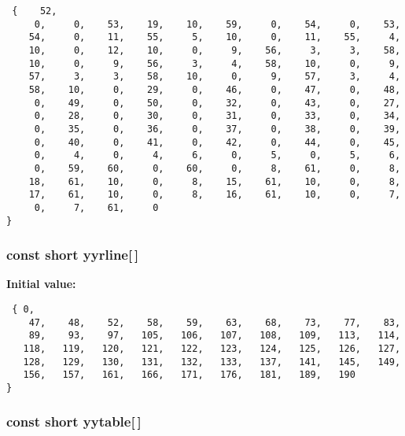 \footnotesize\begin{verbatim} {    52,
     0,     0,    53,    19,    10,    59,     0,    54,     0,    53,
    54,     0,    11,    55,     5,    10,     0,    11,    55,     4,
    10,     0,    12,    10,     0,     9,    56,     3,     3,    58,
    10,     0,     9,    56,     3,     4,    58,    10,     0,     9,
    57,     3,     3,    58,    10,     0,     9,    57,     3,     4,
    58,    10,     0,    29,     0,    46,     0,    47,     0,    48,
     0,    49,     0,    50,     0,    32,     0,    43,     0,    27,
     0,    28,     0,    30,     0,    31,     0,    33,     0,    34,
     0,    35,     0,    36,     0,    37,     0,    38,     0,    39,
     0,    40,     0,    41,     0,    42,     0,    44,     0,    45,
     0,     4,     0,     4,     6,     0,     5,     0,     5,     6,
     0,    59,    60,     0,    60,     0,     8,    61,     0,     8,
    18,    61,    10,     0,     8,    15,    61,    10,     0,     8,
    17,    61,    10,     0,     8,    16,    61,    10,     0,     7,
     0,     7,    61,     0
}\end{verbatim}\normalsize 
{}
\subsubsection{\setlength{\rightskip}{0pt plus 5cm}const short yyrline[$\,$]\hspace{0.3cm}{\tt  [static]}}\label{vcd__parser_8c_a86}


{\bf Initial value:}

\footnotesize\begin{verbatim} { 0,
    47,    48,    52,    58,    59,    63,    68,    73,    77,    83,
    89,    93,    97,   105,   106,   107,   108,   109,   113,   114,
   118,   119,   120,   121,   122,   123,   124,   125,   126,   127,
   128,   129,   130,   131,   132,   133,   137,   141,   145,   149,
   156,   157,   161,   166,   171,   176,   181,   189,   190
}\end{verbatim}\normalsize 
{}
\subsubsection{\setlength{\rightskip}{0pt plus 5cm}const short yytable[$\,$]\hspace{0.3cm}{\tt  [static]}}\label{vcd__parser_8c_a94}


